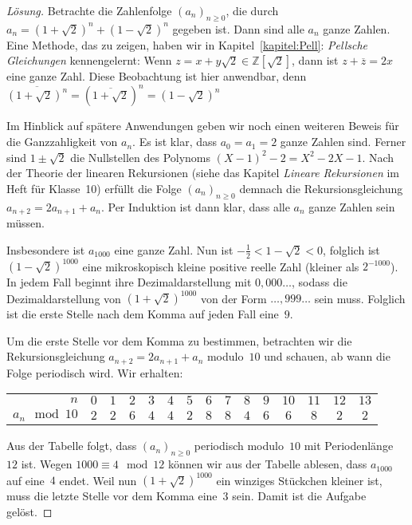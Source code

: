 \begin{proof}[Lösung]
	 Betrachte die Zahlenfolge $(a_n)_{n\geqslant 0}$, die durch $a_n = (1+\sqrt{2})^n + (1-\sqrt{2})^n$ gegeben ist. Dann sind alle $a_n$ ganze Zahlen. Eine Methode, das zu zeigen, haben wir in Kapitel~\ref{kapitel:Pell}: \emph{Pellsche Gleichungen} kennengelernt: Wenn $z=x+y\sqrt{2}\in\mathbb Z[\sqrt{2}]$, dann ist $z+\overline{z}=2x$ eine ganze Zahl. Diese Beobachtung ist hier anwendbar, denn $\overline{(1+\sqrt{2})^n}=(\overline{1+\sqrt{2}})^n=(1-\sqrt{2})^n$
	
	Im Hinblick auf spätere Anwendungen geben wir noch einen weiteren Beweis für die Ganzzahligkeit von $a_n$. Es ist klar, dass $a_0 = a_1 = 2$ ganze Zahlen sind. Ferner sind $1\pm\sqrt{2}$ die Nullstellen des Polynoms $(X-1)^2-2=X^2-2X-1$. Nach der Theorie der linearen Rekursionen (siehe das Kapitel \emph{Lineare Rekursionen} im Heft für Klasse~10) erfüllt die Folge $(a_n)_{n\geqslant 0}$ demnach die Rekursionsgleichung $a_{n+2} = 2a_{n+1} + a_n$. Per Induktion ist dann klar, dass alle $a_n$ ganze Zahlen sein müssen.
	
	Insbesondere ist $a_{1000}$ eine ganze Zahl. Nun ist $-\frac12<1-\sqrt{2}<0$, folglich ist $(1-\sqrt{2})^{1000}$ eine mikroskopisch kleine positive reelle Zahl (kleiner als $2^{-1000}$). In jedem Fall beginnt ihre Dezimaldarstellung mit $0{,}000\dotso$, sodass die Dezimaldarstellung von $(1+\sqrt{2})^{1000}$ von der Form $\ldots{,}999\dotso$ sein muss. Folglich ist die erste Stelle nach dem Komma auf jeden Fall eine~$9$. 
	
	Um die erste Stelle vor dem Komma zu bestimmen, betrachten wir die Rekursionsgleichung $a_{n+2} = 2a_{n+1} + a_n$ modulo~$10$ und schauen, ab wann die Folge periodisch wird. Wir erhalten:
	\begin{center}
		\begin{tabular}{r | c c c c c c c c c c c c c c }\toprule
			$n$ & $0$ & $1$ & $2$ & $3$ & $4$ & $5$ & $6$ & $7$ & $8$ & $9$ & $10$ & $11$ & $12$ & $13$ \\
			$a_n \mod 10$ & $2$ & $2$ & $6$ & $4$ & $4$ & $2$ & $8$ & $8$ & $4$ & $6$ & $6$ & $8$ & $2$ & $2$ \\\bottomrule
		\end{tabular}
	\end{center}
	Aus der Tabelle folgt, dass $(a_n)_{n\geqslant 0}$ periodisch modulo~$10$ mit Periodenlänge~$12$ ist. Wegen $1000\equiv 4\mod 12$ können wir aus der Tabelle ablesen, dass $a_{1000}$ auf eine~$4$ endet. Weil nun $(1+\sqrt{2})^{1000}$ ein winziges Stückchen kleiner ist, muss die letzte Stelle vor dem Komma eine~$3$ sein. Damit ist die Aufgabe gelöst.
\end{proof}

